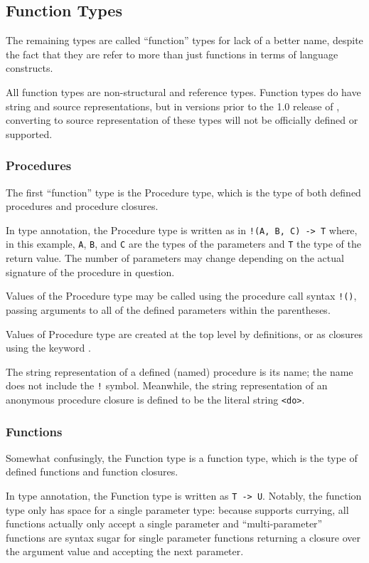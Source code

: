 \subsection{Function Types}

The remaining types are called ``function'' types for lack of a better name,
despite the fact that they are refer to more than just functions in terms of
language constructs.

All function types are non-structural and reference types. Function types do
have string and source representations, but in versions prior to the 1.0
release of \Trilogy{}, converting to source representation of these types will
not be officially defined or supported.

\subsubsection{Procedures}

The first ``function'' type is the Procedure type, which is the type of both
defined procedures and procedure closures.

In type annotation, the Procedure type is written as in \texttt{!(A, B, C) -> T}
where, in this example, \texttt{A}, \texttt{B}, and \texttt{C} are the types of
the parameters and \texttt{T} the type of the return value. The number of parameters
may change depending on the actual signature of the procedure in question.

Values of the Procedure type may be called using the procedure call syntax \texttt{!()},
passing arguments to all of the defined parameters within the parentheses.

Values of Procedure type are created at the top level by  definitions, or as
closures using the keyword .

The string representation of a defined (named) procedure is its name; the name does
not include the \texttt{!} symbol. Meanwhile, the string representation of an anonymous
procedure closure is defined to be the literal string \texttt{<do>}.

\subsubsection{Functions}

Somewhat confusingly, the Function type is a function type, which is the type of
defined functions and function closures.

In type annotation, the Function type is written as \texttt{T -> U}. Notably, the
function type only has space for a single parameter type: because \Poetry{} supports
currying, all functions actually only accept a single parameter and ``multi-parameter''
functions are syntax sugar for single parameter functions returning a closure over
the argument value and accepting the next parameter.

